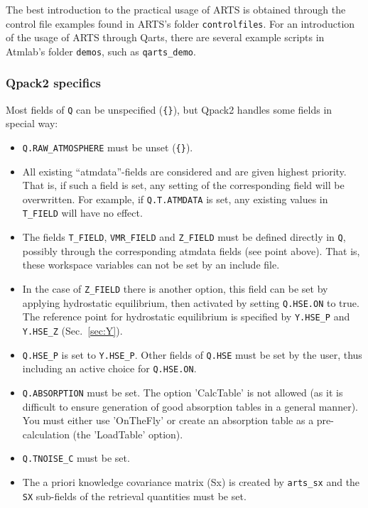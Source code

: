 \documentclass[a4paper,11pt]{article}
\begin{document}
The best introduction to the practical usage of ARTS is obtained through the
control file examples found in ARTS's folder \verb|controlfiles|. For an
introduction of the usage of ARTS through Qarts, there are several example
scripts in Atmlab's folder \verb|demos|, such as \verb|qarts_demo|.


\subsubsection{Qpack2 specifics}
%
Most fields of \verb|Q| can be unspecified (\verb|{}|), but Qpack2 handles some
fields in special way:
\begin{itemize}
\item \verb|Q.RAW_ATMOSPHERE| must be unset (\verb|{}|).
\item All existing ``atmdata''-fields are considered and are given highest
  priority. That is, if such a field is set, any setting of the corresponding
  field will be overwritten. For example, if \verb|Q.T.ATMDATA| is set, any
  existing values in \verb|T_FIELD| will have no effect.
\item The fields \verb|T_FIELD|, \verb|VMR_FIELD| and \verb|Z_FIELD| must
  be defined directly in \verb|Q|, possibly through the corresponding atmdata
  fields (see point above). That is, these workspace variables can not
  be set by an include file. 
\item In the case of \verb|Z_FIELD| there is another option, this field can be
  set by applying hydrostatic equilibrium, then activated by setting
  \verb|Q.HSE.ON| to true. The reference point for hydrostatic equilibrium is
  specified by \verb|Y.HSE_P| and \verb|Y.HSE_Z| (Sec.~\ref{sec:Y}). 
\item \verb|Q.HSE_P| is set to \verb|Y.HSE_P|. Other fields of \verb|Q.HSE|
  must be set by the user, thus including an active choice for \verb|Q.HSE.ON|.
\item \verb|Q.ABSORPTION| must be set. The option 'CalcTable' is not allowed
  (as it is difficult to ensure generation of good absorption tables in a
  general manner). You must either use 'OnTheFly' or create an absorption table
  as a pre-calculation (the 'LoadTable' option).
\item \verb|Q.TNOISE_C| must be set.
\item The a priori knowledge covariance matrix (Sx) is created by
  \verb|arts_sx| and the \verb|SX| sub-fields of the retrieval quantities must
  be set.
\end{itemize}
\end{document}
